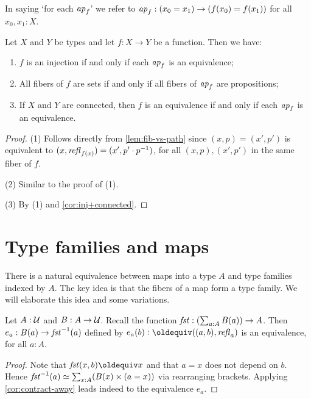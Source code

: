 \begin{definition}
In saying `for each $\mathop{{\it ap}_{f}}$' we refer to
$\mathop{{\it ap}_{f}}: (x_0=x_1) \to (f(x_0)=f(x_1))$ for all $x_0,x_1:X$.

\begin{corollary}\label{cor:fib-vs-path}
Let $X$ and $Y$ be types and let $f:X\to Y$ be a function. Then we have:
\begin{enumerate}
\item $f$ is an injection if and only if each $\mathop{{\it ap}_{f}}$ is an equivalence;
\item All fibers of $f$ are sets if and only if all fibers of $\mathop{{\it ap}_{f}}$ are propositions;
\item If $X$ and $Y$ are connected, then $f$ is an equivalence 
if and only if each $\mathop{{\it ap}_{f}}$ is an equivalence.
\end{enumerate}
\end{corollary}
\begin{proof}
(1) Follows directly from \cref{lem:fib-vs-path} since $(x,p)=(x',p')$ is
equivalent to $(x,\mathop{{\it refl}_{f(x)}}) = (x',p'\cdot p^{-1})$, for all $(x,p),(x',p')$
in the same fiber of $f$.

(2) Similar to the proof of (1).

(3) By (1) and \cref{cor:inj+connected}.
\end{proof}


\section{Type families and maps}
\label{sec:typefam}

There is a natural equivalence between maps into a type $A$
and type families indexed by $A$. The key idea is that the
fibers of a map form a type family. We will elaborate this
idea and some variations.


\begin{lemma}\label{lem:fst-fiber(a)=B(a)}
Let $A:\mathcal{U}$ and $B:A\to\mathcal{U}$.
Recall the function $\mathop{\mathit{fst}}: (\sum_{a:A} B(a))\to A$.
Then $e_a: B(a) \to \mathop{\mathit{fst}}^{-1}(a)$ defined by 
$e_a(b)\defeq ((a,b),\refl{a})$ is an equivalence,
for all $a:A$.
\end{lemma}
\begin{proof}
Note that $\fst(x,b)\jdeq x$ and that $a=x$ does
not depend on $b$. Hence
$\mathop{\mathit{fst}}^{-1}(a) \simeq \sum_{x:A}  (B(x) \times (a=x))$
via rearranging brackets.
Applying \cref{cor:contract-away} leads indeed to 
the equivalence $e_a$. 
\end{proof}


\end{definition}
